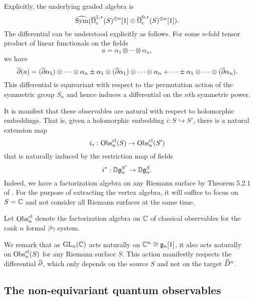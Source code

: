 Explicitly, the underlying graded algebra is
\[
\widehat{{\rm Sym}}(\overline{\Omega}^{1,*}_c(S)^{\oplus n}[1] \oplus \overline{\Omega}^{0,*}_c(S)^{\oplus n}[1]).
\]
The differential can be understood explicitly as follows.
For some $n$-fold tensor product of linear functionals on the fields
\[
a = \alpha_1 \otimes \cdots \otimes \alpha_n,
\]
we have
\[
\overline{\partial}(a) = (\overline{\partial} \alpha_1) \otimes \cdots \otimes \alpha_n \pm \alpha_1 \otimes (\overline{\partial} \alpha_1) \otimes \cdots \otimes \alpha_n + \cdots \pm\alpha_1 \otimes \cdots \otimes (\overline{\partial} \alpha_n).
\]
This differential is equivariant with respect to the permutation action of the symmetric group $S_n$ and 
hence induces a differential on the $n$th symmetric power.

It is manifest that these observables are natural with respect to holomorphic embeddings.
That is, given a holomorphic embedding $i: S \hookrightarrow S'$,
there is a natural extension map
\[
i_*: {\rm Obs}^{\rm cl}_n(S) \to {\rm Obs}^{\rm cl}_n(S')
\]
that is naturally induced by the restriction map of fields
\[
i^*: \mathbb D\mathfrak{g}_n^{S'} \to \mathbb D\mathfrak{g}_n^{S}.
\]
Indeed, we have a factorization algebra on any Riemann surface by Theorem 5.2.1 of \cite{CG}.
For the purpose of extracting the vertex algebra, it will suffice to focus on $S = \mathbb C$ and not consider all Riemann surfaces at the same time.

\begin{dfn}
Let ${\rm Obs}^{\rm cl}_n$ denote the factorization algebra on $\mathbb C$ of classical observables for the rank $n$ formal $\beta\gamma$ system.
\end{dfn}

We remark that as ${\rm GL}_n(\mathbb C)$ acts naturally on $\mathbb C^n \cong \mathfrak{g}_n[1]$,
it also acts naturally on ${\rm Obs}^{\rm cl}_n(S)$ for any Riemann surface $S$.
This action manifestly respects the differential $\overline{\partial}$, 
which only depends on the source $S$ and not on the target $\widehat{D}^n$.

\subsection{The non-equivariant quantum observables}

